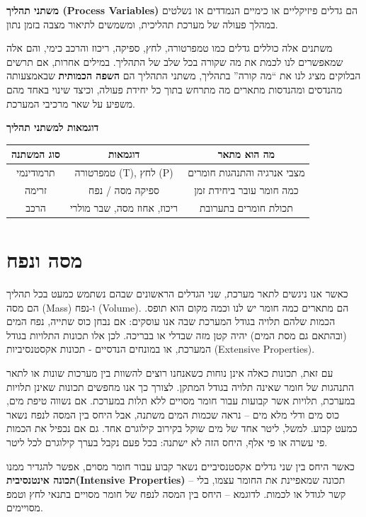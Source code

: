 \documentclass[
  hebrew,
  letterpaper,
  DIV=11,
  numbers=noendperiod]{scrreprt}
\begin{document}
\textbf{{משתני תהליך} (Process Variables)} {הם גדלים פיזיקליים או כימיים
הנמדדים או נשלטים במהלך פעולה של מערכת תהליכית, ומשמשים לתיאור מצבה בזמן
נתון.}

{משתנים אלה כוללים גדלים כמו טמפרטורה, לחץ, ספיקה, ריכוז והרכב כימי},
{והם אלה שמאפשרים לנו לכמת את מה שקורה בכל שלב של התהליך. במילים אחרות,
אם תרשים הבלוקים מציג לנו את ``מה קורה'' בתהליך, משתני התהליך הם
\textbf{השפה הכמותית} שבאמצעותה מהנדסים ומהנדסות מתארים מה מתרחש בתוך כל
יחידת פעולה, וכיצד שינוי באחד מהם משפיע על שאר מרכיבי המערכת}.

\textbf{דוגמאות למשתני תהליך}

\begin{longtable}[]{@{}ccc@{}}
\toprule\noalign{}
\textbf{סוג המשתנה} & \textbf{דוגמאות} & \textbf{מה הוא מתאר} \\
\midrule\noalign{}
\endhead
\bottomrule\noalign{}
\endlastfoot
תרמודינמי & טמפרטורה (T), לחץ (P) & מצבי אנרגיה והתנהגות חומרים \\
זרימה & ספיקה מסה / נפח & כמה חומר עובר ביחידת זמן \\
הרכב & ריכוז, אחוז מסה, שבר מולרי & תכולת חומרים בתערובת \\
\end{longtable}

\section{\texorpdfstring{{מסה
ונפח}}{מסה ונפח}}\label{ux5deux5e1ux5d4-ux5d5ux5e0ux5e4ux5d7}

כאשר אנו ניגשים לתאר מערכת, שני הגדלים הראשונים שבהם נשתמש כמעט בכל
תהליך הם מסה (Mass) ו-נפח (Volume). הם מתארים כמה חומר יש לנו וכמה מקום
הוא תופס. הכמות שלהם תלויה בגודל המערכת שבה אנו עוסקים: אם נבחן כוס
שתייה, נפח המים (ובהתאם גם מסת המים) יהיה קטן מזה שבדלי או בבריכה. לכן
אלו תכונות התלויות בגודל המערכת, או במונחים הנדסיים - תכונות אקסטנסיביות
(Extensive Properties).

{עם זאת, תכונות כאלה אינן נוחות כשאנחנו רוצים להשוות בין מערכות שונות או
לתאר התנהגות של חומר שאינה תלויה בגודל המתקן. לצורך כך אנו מחפשים תכונות
שאינן תלויות במערכת, תלויות אשר קבועות עבור חומר מסויים ללא תלות במערכת.
אם נשווה טיפת מים, כוס מים ודלי מלא מים -- נראה שכמות המים משתנה, אבל
היחס בין המסה לנפח נשאר כמעט קבוע}. {למשל, ליטר אחד של מים שוקל בקירוב
קילוגרם אחד}. {גם אם נכפיל את הכמות פי עשרה או פי אלף, היחס הזה לא
ישתנה: בכל פעם נקבל בערך קילוגרם לכל ליטר}.

{כאשר היחס בין שני גדלים אקסטנסיביים נשאר קבוע עבור חומר מסוים, אפשר
להגדיר ממנו \textbf{תכונה אינטנסיבית}}\textbf{(Intensive Properties)}
{}-- {תכונה שמאפיינת את החומר עצמו, בלי קשר לגודל או לכמות}. {לדוגמא --
היחס בין המסה לנפח של חומר מסויים בתנאי לחץ וטמפ\textquotesingle{}
מסויימים.\\
}
\end{document}
